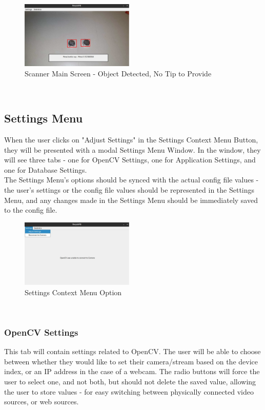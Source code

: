 \documentclass[conference]{IEEEtran}
\begin{document}
\begin{figure}[!h]
    \centering
    \includegraphics[width=0.48\textwidth]{images/bottlecap_detected.eps}
    \caption{Scanner Main Screen - Object Detected, No Tip to Provide}
\end{figure}~\\

\subsection{Settings Menu}
When the user clicks on "Adjust Settings" in the Settings Context Menu Button, they will be presented with a modal Settings Menu Window. In the window, they will see three tabs - one for OpenCV Settings, one for Application Settings, and one for Database Settings.~\\

The Settings Menu's options should be synced with the actual config file values - the user's settings or the config file values should be represented in the Settings Menu, and any changes made in the Settings Menu should be immediately saved to the config file.~\\

\begin{figure}[!h]
    \centering
    \includegraphics[width=0.48\textwidth]{images/adjust_settings.eps}
    \caption{Settings Context Menu Option}
\end{figure}~\\

\newpage
\subsubsection{OpenCV Settings}
This tab will contain settings related to OpenCV. The user will be able to choose between whether they would like to set their camera/stream based on the device index, or an IP address in the case of a webcam. The radio buttons will force the user to select one, and not both, but should not delete the saved value, allowing the user to store values - for easy switching between physically connected video sources, or web sources.~\\
\end{document}
